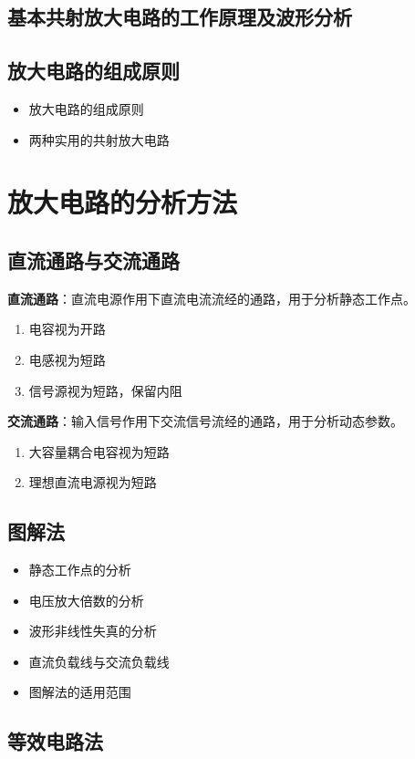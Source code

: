 \subsection{基本共射放大电路的工作原理及波形分析}
\subsection{放大电路的组成原则}
\begin{itemize}
    \item 放大电路的组成原则
    \item 两种实用的共射放大电路
\end{itemize}

\section{放大电路的分析方法}
\subsection{直流通路与交流通路}
\textbf{直流通路}：直流电源作用下直流电流流经的通路，用于分析静态工作点。
\begin{enumerate}
    \item 电容视为开路
    \item 电感视为短路
    \item 信号源视为短路，保留内阻
\end{enumerate}

\textbf{交流通路}：输入信号作用下交流信号流经的通路，用于分析动态参数。
\begin{enumerate}
    \item 大容量耦合电容视为短路
    \item 理想直流电源视为短路
\end{enumerate}

\subsection{图解法}
\begin{itemize}
    \item 静态工作点的分析
    \item 电压放大倍数的分析
    \item 波形非线性失真的分析
    \item 直流负载线与交流负载线
    \item 图解法的适用范围
\end{itemize}

\subsection{等效电路法}
